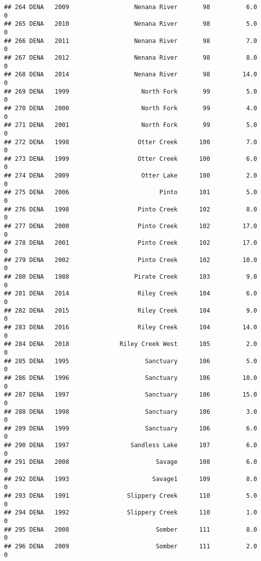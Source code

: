 \documentclass[
]{article}
\begin{document}
\begin{verbatim}
## 264 DENA   2009                  Nenana River       98          6.0       0
## 265 DENA   2010                  Nenana River       98          5.0       0
## 266 DENA   2011                  Nenana River       98          7.0       0
## 267 DENA   2012                  Nenana River       98          8.0       0
## 268 DENA   2014                  Nenana River       98         14.0       0
## 269 DENA   1999                    North Fork       99          5.0       0
## 270 DENA   2000                    North Fork       99          4.0       0
## 271 DENA   2001                    North Fork       99          5.0       0
## 272 DENA   1998                   Otter Creek      100          7.0       0
## 273 DENA   1999                   Otter Creek      100          6.0       0
## 274 DENA   2009                    Otter Lake      100          2.0       0
## 275 DENA   2006                         Pinto      101          5.0       0
## 276 DENA   1998                   Pinto Creek      102          8.0       0
## 277 DENA   2000                   Pinto Creek      102         17.0       0
## 278 DENA   2001                   Pinto Creek      102         17.0       0
## 279 DENA   2002                   Pinto Creek      102         10.0       0
## 280 DENA   1988                  Pirate Creek      103          9.0       0
## 281 DENA   2014                   Riley Creek      104          6.0       0
## 282 DENA   2015                   Riley Creek      104          9.0       0
## 283 DENA   2016                   Riley Creek      104         14.0       0
## 284 DENA   2018              Riley Creek West      105          2.0       0
## 285 DENA   1995                     Sanctuary      106          5.0       0
## 286 DENA   1996                     Sanctuary      106         10.0       0
## 287 DENA   1997                     Sanctuary      106         15.0       0
## 288 DENA   1998                     Sanctuary      106          3.0       0
## 289 DENA   1999                     Sanctuary      106          6.0       0
## 290 DENA   1997                 Sandless Lake      107          6.0       0
## 291 DENA   2008                        Savage      108          6.0       0
## 292 DENA   1993                       Savage1      109          8.0       0
## 293 DENA   1991                Slippery Creek      110          5.0       0
## 294 DENA   1992                Slippery Creek      110          1.0       0
## 295 DENA   2008                        Somber      111          8.0       0
## 296 DENA   2009                        Somber      111          2.0       0

\end{verbatim}
\end{document}

